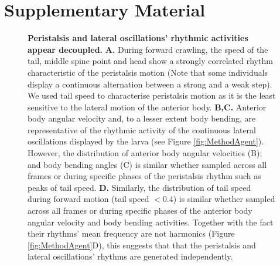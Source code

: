 

\newpage
\clearpage
\beginsupplement
\section{Supplementary Material}



\begin{figure}[ht!]
\begin{center}
\caption{{\bf Peristalsis and lateral oscillations’ rhythmic activities appear decoupled.}
{\bf A.} During forward crawling, the speed of the tail, middle spine point and head show a strongly correlated rhythm characteristic of the peristalsis motion (Note that some individuals display a continuous alternation between a strong and a weak step). We used tail speed to characterise peristalsis motion as it is the least sensitive to the lateral motion of the anterior body.
{\bf B,C.} Anterior body angular velocity and, to a lesser extent body bending, are representative of the rhythmic activity of the continuous lateral oscillations displayed by the larva (see Figure \ref{fig:MethodAgent}). However, the distribution of anterior body angular velocities (B); and body bending angles (C) is similar whether sampled across all frames or during specific phases of the peristalsis rhythm such as peaks of tail speed. {\bf D.} Similarly, the distribution of tail speed during forward motion (tail speed $< 0.4$) is similar whether sampled across all frames or during specific phases of the anterior body angular velocity and body bending activities. Together with the fact their rhythms’ mean frequency are not harmonics (Figure \ref{fig:MethodAgent}D), this suggests that that the peristalsis and lateral oscillations’ rhythms are generated independently.
 \label{fig:FigS1}}
\end{center}
\end{figure}



